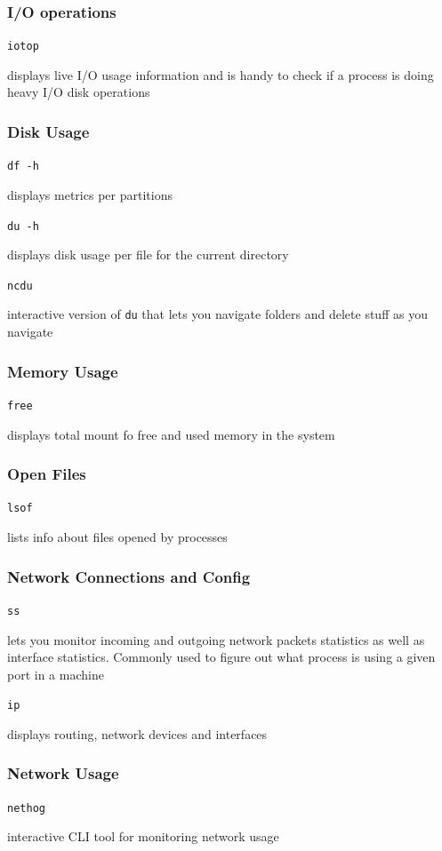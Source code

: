 \documentclass[letterpaper,12pt]{article}
\newcommand*{\lstitem}[1]{
  \setbox0\hbox{\lstinline{#1}}
  \item[\usebox0]
}
\begin{document}
\subsubsection{I/O operations}
\begin{description}
 \lstitem{iotop} displays live I/O usage information and is handy to check if a process is doing heavy I/O disk operations
\end{description}

\subsubsection{Disk Usage}
\begin{description}
 \lstitem{df -h} displays metrics per partitions
 \lstitem{du -h} displays disk usage per file for the current directory
 \lstitem{ncdu} interactive version of \lstinline{du} that lets you navigate folders and delete stuff as you navigate
\end{description}

\subsubsection{Memory Usage}
\begin{description}
 \lstitem{free} displays total mount fo free and used memory in the system
\end{description}

\subsubsection{Open Files}
\begin{description}
 \lstitem{lsof} lists info about files opened by processes
\end{description}

\subsubsection{Network Connections and Config}
\begin{description}
 \lstitem{ss} lets you monitor incoming and outgoing network packets statistics as well as interface statistics. Commonly used to figure out what process is using a given port in a machine
 \lstitem{ip} displays routing, network devices and interfaces
\end{description}

\subsubsection{Network Usage}
\begin{description}
 \lstitem{nethog} interactive CLI tool for monitoring network usage
\end{description}
\end{document}
